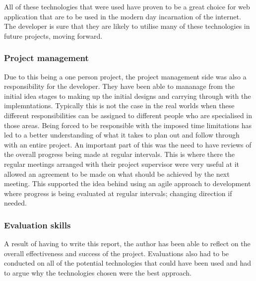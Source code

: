 All of these technologies that were used have proven to be a great choice for web application that are to be used in the modern day incarnation of the
internet. 
The developer is sure that they are likely to utilise many of these technologies in future projects, moving forward.


\subsubsection*{Project management}
Due to this being a one person project, the project management side was also a responsibility for the developer.
They have been able to mananage from the initial idea stages to making up the initial designs and carrying through with the implemntations.
Typically this is not the case in the real worlds when these different responsibilities can be assigned to different people who are specialised in 
those areas.
Being forced to be responsible with the imposed time limitations has led to a better understanding of what it takes to plan out and follow through
with an entire project.  
An important part of this was the need to have reviews of the overall progress being made at regular intervals.
This is where there the regular meetings arranged with their project supervisor were very useful at it allowed an agreement to be made on what should 
be achieved by the next meeting.
This supported the idea behind using an agile approach to development where progress is being evaluated at regular intervals; changing direction if 
needed.

\subsubsection*{Evaluation skills}
A result of having to write this report, the author has been able to reflect on the overall effectiveness and success of the project.
Evaluations also had to be conducted on all of the potential technologies that could have been used and had to argue why the technologies chosen 
were the best approach.